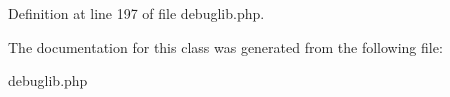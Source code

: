 Definition at line 197 of file debuglib.\+php.



The documentation for this class was generated from the following file\+:\begin{DoxyCompactItemize}
\item 
debuglib.\+php\end{DoxyCompactItemize}
